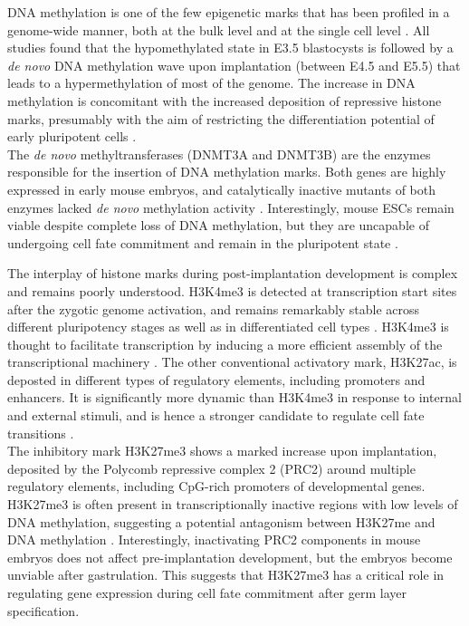 DNA methylation is one of the few epigenetic marks that has been profiled in a genome-wide manner, both at the bulk level and at the single cell level \cite{Auclar2014,Zhang2017,Dai2016,Rulands2018}. All studies found that the hypomethylated state in E3.5 blastocysts is followed by a \textit{de novo} DNA methylation wave upon implantation (between E4.5 and E5.5) that leads to a hypermethylation of most of the genome. The increase in DNA methylation is concomitant with the increased deposition of repressive histone marks, presumably with the aim of restricting the differentiation potential of early pluripotent cells \cite{Atlasi2017}.\\
The \textit{de novo} methyltransferases (DNMT3A and DNMT3B) are the enzymes responsible for the insertion of DNA methylation marks. Both genes are highly expressed in early mouse embryos, and catalytically inactive mutants of both enzymes lacked \textit{de novo} methylation activity \cite{Auclair2014,Okano1999}. Interestingly, mouse ESCs remain viable despite complete loss of DNA methylation, but they are uncapable of undergoing cell fate commitment and remain in the pluripotent state \cite{Tsumura2006}.

The interplay of histone marks during post-implantation development is complex and remains poorly understood. H3K4me3 is detected at transcription start sites after the zygotic genome activation, and remains remarkably stable across different pluripotency stages as well as in differentiated cell types \cite{Heintzman2009}. H3K4me3 is thought to facilitate transcription by inducing a more efficient assembly of the transcriptional machinery \cite{Atlasi2017,Vastenhouw2010}. The other conventional activatory mark, H3K27ac, is deposted in different types of regulatory elements, including promoters and enhancers. It is significantly more dynamic than H3K4me3 in response to internal and external stimuli, and is hence a stronger candidate to regulate cell fate transitions \cite{Atlasi2017,Rada-Iglesias2011}.\\
The inhibitory mark H3K27me3 shows a marked increase upon implantation, deposited by the Polycomb repressive complex 2 (PRC2) around multiple regulatory elements, including CpG-rich promoters of developmental genes. H3K27me3 is often present in transcriptionally inactive regions with low levels of DNA methylation, suggesting a potential antagonism between H3K27me and DNA methylation \cite{Brinkman2012,Atlasi2017}. Interestingly, inactivating PRC2 components in mouse embryos does not affect pre-implantation development, but the embryos become unviable after gastrulation\cite{Shan2017}. This suggests that H3K27me3 has a critical role in regulating gene expression during cell fate commitment after germ layer specification.

